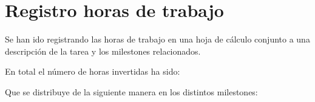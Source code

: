 %
\chapter{Registro horas de trabajo}  

Se han ido registrando las horas  de trabajo
en una hoja de cálculo \cite{TFG-hoja-calculo-horas-trabajo}
conjunto a una descripción de la tarea y los milestones relacionados. 

En total el número de horas invertidas ha sido: 

Que se distribuye de la siguiente manera en los distintos milestones: 